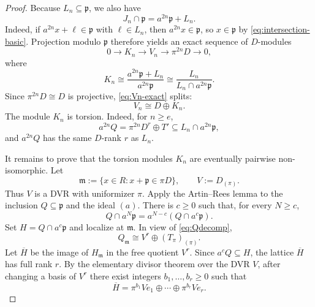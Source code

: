 \documentclass[11pt]{article}
\theoremstyle{definition}
\begin{document}
\begin{proof}
Because $L_n\subseteq\mathfrak p$, we also have
\[
 J_n\cap\mathfrak p=a^{2n}\mathfrak p+L_n.
\]
Indeed, if $a^{2n}x+\ell\in\mathfrak p$ with $\ell\in L_n$, then
$a^{2n}x\in\mathfrak p$, so $x\in\mathfrak p$ by \eqref{eq:intersection-basic}.
Projection modulo $\mathfrak p$ therefore yields an exact sequence of $D$-modules
\begin{equation}\label{eq:Vn-exact}
 0\longrightarrow K_n\longrightarrow V_n\longrightarrow \pi^{2n}D\longrightarrow0,
\end{equation}
where
\begin{equation}\label{eq:Kn}
 K_n
 \cong
 \frac{a^{2n}\mathfrak p+L_n}{a^{2n}\mathfrak p}
 \cong
 \frac{L_n}{L_n\cap a^{2n}\mathfrak p}.
\end{equation}
Since $\pi^{2n}D\cong D$ is projective, \eqref{eq:Vn-exact} splits:
\begin{equation}\label{eq:Vn-split}
 V_n\cong D\oplus K_n.
\end{equation}
The module $K_n$ is torsion.  Indeed, for $n\ge e$,
\[
 a^{2n}Q
 =\pi^{2n}D^r\oplus T'
 \subseteq L_n\cap a^{2n}\mathfrak p,
\]
and $a^{2n}Q$ has the same $D$-rank $r$ as $L_n$.

It remains to prove that the torsion modules $K_n$ are eventually pairwise non-isomorphic.
Let
\[
 \mathfrak m:=\{x\in R:x+\mathfrak p\in\pi D\},
 \qquad
 V:=D_{(\pi)}.
\]
Thus $V$ is a DVR with uniformizer $\pi$.  Apply the Artin--Rees lemma to the inclusion
$Q\subseteq\mathfrak p$ and the ideal $(a)$.  There is $c\ge0$ such that, for every $N\ge c$,
\begin{equation}\label{eq:AR}
 Q\cap a^N\mathfrak p
 =a^{N-c}(Q\cap a^c\mathfrak p).
\end{equation}
Set $H=Q\cap a^c\mathfrak p$ and localize at $\mathfrak m$.  In view of
\eqref{eq:Qdecomp},
\[
 Q_{\mathfrak m}\cong V^r\oplus (T_\pi)_{(\pi)}.
\]
Let $\overline H$ be the image of $H_{\mathfrak m}$ in the free quotient $V^r$.  Since
$a^cQ\subseteq H$, the lattice $\overline H$ has full rank $r$.  By the elementary divisor
theorem over the DVR $V$, after changing a basis of $V^r$ there exist integers
$b_1,\ldots,b_r\ge0$ such that
\begin{equation}\label{eq:H-lattice}
 \overline H=\pi^{b_1}Ve_1\oplus\cdots\oplus\pi^{b_r}Ve_r.
\end{equation}


\end{proof}
\end{document}
